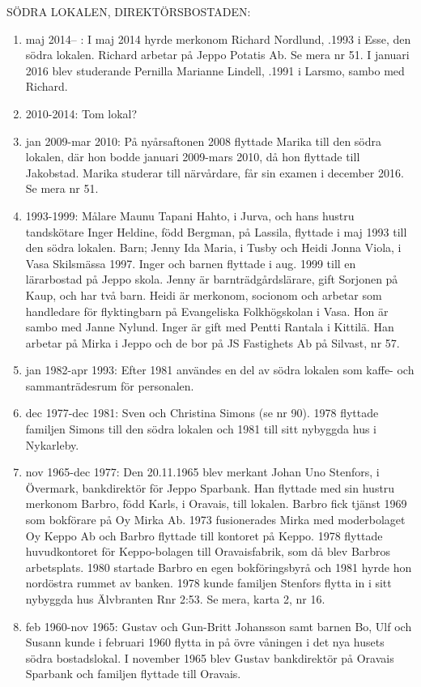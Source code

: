 SÖDRA LOKALEN, DIREKTÖRSBOSTADEN:
\begin{enumerate}
  \item 	maj 2014--  : I maj 2014 hyrde merkonom Richard Nordlund, .1993 i Esse, den södra lokalen. Richard arbetar på Jeppo Potatis Ab. Se mera nr 51. I januari 2016 blev studerande Pernilla Marianne Lindell, .1991 i Larsmo, sambo med Richard.
  \item 2010-2014: Tom lokal?
  \item jan 2009-mar 2010: På nyårsaftonen 2008 flyttade Marika till den södra lokalen, där hon bodde januari 2009-mars 2010, då hon flyttade till Jakobstad. Marika studerar till närvårdare, får sin examen i december 2016. Se mera nr 51.
  \item 1993-1999: Målare Maunu Tapani Hahto,  i Jurva, och hans hustru tandskötare Inger Heldine, född Bergman,  på Lassila, flyttade i maj 1993 till den södra lokalen.
  Barn;	Jenny Ida Maria,	 i Tusby och	Heidi Jonna Viola,	 i Vasa
  Skilsmässa 1997. Inger och barnen flyttade i aug. 1999 till en lärarbostad på Jeppo skola. Jenny är barnträdgårdslärare, gift Sorjonen på Kaup, och har två barn. Heidi är merkonom, socionom och arbetar som handledare för flyktingbarn på Evangeliska Folkhögskolan i Vasa. Hon är sambo med Janne Nylund. Inger är gift med Pentti Rantala  i Kittilä. Han arbetar på Mirka i Jeppo och de bor på JS Fastighets Ab på Silvast, nr 57.
  \item jan 1982-apr 1993: Efter 1981 användes en del av södra lokalen som kaffe- och sammanträdesrum för personalen.
  \item dec 1977-dec 1981: Sven och Christina Simons (se nr 90). 1978 flyttade familjen Simons till den södra lokalen och 1981 till sitt nybyggda hus i Nykarleby.
  \item nov 1965-dec 1977: 	Den 20.11.1965 blev merkant Johan Uno Stenfors,  i Övermark, bankdirektör för Jeppo Sparbank. Han flyttade med sin hustru merkonom Barbro, född Karls,  i Oravais, till lokalen. Barbro fick tjänst 1969 som bokförare på Oy Mirka Ab. 1973 fusionerades Mirka med moderbolaget Oy Keppo Ab och Barbro flyttade till kontoret på Keppo. 1978 flyttade huvudkontoret för Keppo-bolagen till Oravaisfabrik, som då blev Barbros arbetsplats. 1980 startade Barbro en egen bokföringsbyrå och 1981 hyrde hon nordöstra rummet av banken. 1978 kunde familjen Stenfors flytta in i sitt nybyggda hus Älvbranten Rnr 2:53. Se mera, karta 2, nr 16.
  \item feb 1960-nov 1965: Gustav och Gun-Britt Johansson samt barnen Bo, Ulf och Susann kunde i februari 1960 flytta in på övre våningen i det nya husets södra bostadslokal. I november 1965 blev Gustav bankdirektör på Oravais Sparbank och familjen flyttade till Oravais.
\end{enumerate}

